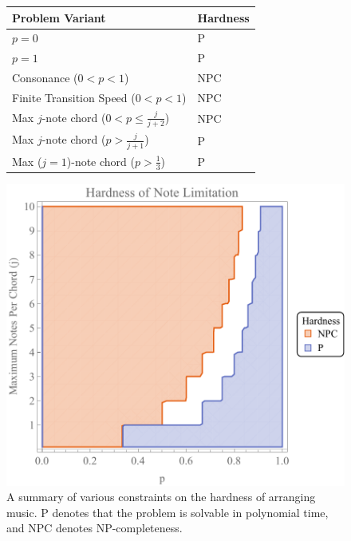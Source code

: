 \documentclass[11pt,letterpaper]{article}
\begin{document}
\begin{figure}[!htb]
    \centering
    \begin{minipage}[t]{.54\textwidth}
        \vspace{7mm}
        {
        \begin{tabular}{@{}l | l @{}}
    Problem Variant & Hardness \\ \hline
    $p=0$ & P \\ 
    $p=1$ & P \\ 
    Consonance ($0<p<1$) & NPC \\ 
    Finite Transition Speed ($0<p<1$) & NPC \\ 
    Max $j$-note chord ($0<p \leq \frac{j}{j+2}$) & NPC \\ 
    Max $j$-note chord ($p>\frac{j}{j+1}$) & P \\ 
    Max ($j=1$)-note chord ($p>\frac{1}{3}$) & P \\ 
    \end{tabular}
        }
    \end{minipage}%
    \hfill
    \begin{minipage}[t]{0.44\textwidth}
        \vspace{0pt}
        \includegraphics[width=\linewidth]{plot.pdf}
    \end{minipage}
\caption{A summary of various constraints on the hardness of arranging music. P denotes that the problem is solvable in polynomial time, and NPC denotes NP-completeness. }
    \label{tbl:1}
\end{figure}
\end{document}
